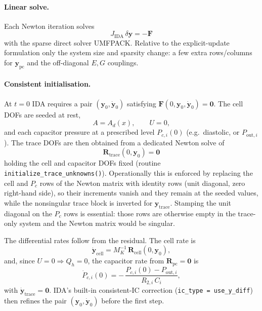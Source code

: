 \documentclass[11pt]{article}
\begin{document}
\paragraph{Linear solve.}
Each Newton iteration solves
\begin{equation}
  J_{\mathrm{IDA}}\,\delta\mathbf y=-\mathbf F
  \label{eq:ida_linsolve}
\end{equation}
with the sparse direct solver UMFPACK. Relative to the explicit-update
formulation only the system size and sparsity change: a few extra rows/columns
for $\mathbf y_{\mathrm{pc}}$ and the off-diagonal $E,G$ couplings.

\paragraph{Consistent initialisation.}
At $t=0$ IDA requires a pair $(\mathbf y_0,\dot{\mathbf y}_0)$ satisfying
$\mathbf F(0,\mathbf y_0,\dot{\mathbf y}_0)=\mathbf 0$. The cell DOFs are seeded
at rest,
\begin{equation}
  A=A_d(x),\qquad U=0,
  \label{eq:ida_seed_cell}
\end{equation}
and each capacitor pressure at a prescribed level $P_{c,i}(0)$ (e.g.\ diastolic,
or $P_{\mathrm{out},i}$). The trace DOFs are then obtained from a dedicated
Newton solve of
\begin{equation}
  \mathbf R_{\mathrm{trace}}(0,\mathbf y_0)=\mathbf 0
  \label{eq:ida_traceinit}
\end{equation}
holding the cell and capacitor DOFs fixed (routine
\texttt{initialize\_trace\_unknowns()}). Operationally this is enforced by
replacing the cell and $P_c$ rows of the Newton matrix with identity rows (unit
diagonal, zero right-hand side), so their increments vanish and they remain at
the seeded values, while the nonsingular trace block is inverted for
$\mathbf y_{\mathrm{trace}}$. Stamping the unit diagonal on the $P_c$ rows is
essential: those rows are otherwise empty in the trace-only system and the
Newton matrix would be singular.

The differential rates follow from the residual. The cell rate is
\begin{equation}
  \dot{\mathbf y}_{\mathrm{cell}}
  =M_K^{-1}\,\mathbf R_{\mathrm{cell}}(0,\mathbf y_0),
  \label{eq:ida_ydotcell}
\end{equation}
and, since $U=0\Rightarrow Q_h=0$, the capacitor rate from
$\mathbf R_{\mathrm{pc}}=\mathbf 0$ is
\begin{equation}
  \dot P_{c,i}(0)
  =-\,\frac{P_{c,i}(0)-P_{\mathrm{out},i}}{R_{2,i}\,C_i},
  \label{eq:ida_ydotpc}
\end{equation}
with $\dot{\mathbf y}_{\mathrm{trace}}=\mathbf 0$. IDA's built-in
consistent-IC correction (\texttt{ic\_type = use\_y\_diff}) then refines the
pair $(\mathbf y_0,\dot{\mathbf y}_0)$ before the first step.
\end{document}
